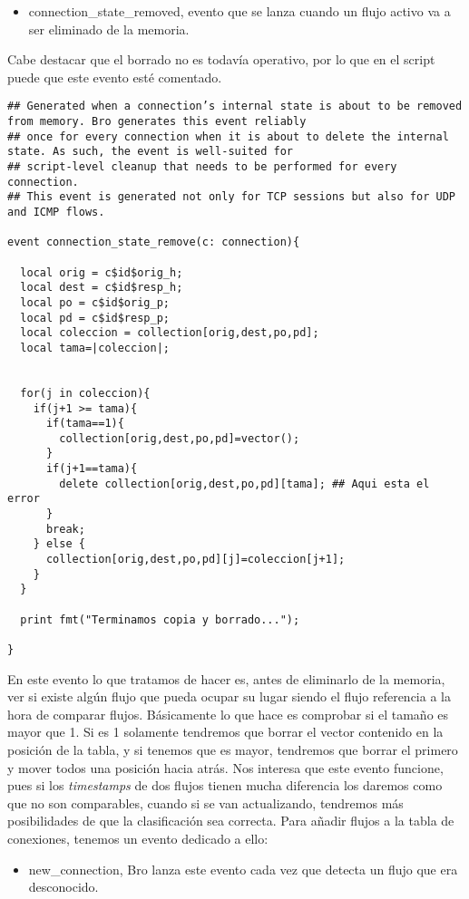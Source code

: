 \begin{itemize}
\item connection\_state\_removed, evento que se lanza cuando un flujo activo va a ser 
eliminado de la memoria.
\end{itemize}

Cabe destacar que el borrado no es todavía operativo, por lo que en el script puede 
que este evento esté comentado.
\intro
\begin{lstlisting}[style=Codigoc]
## Generated when a connection’s internal state is about to be removed from memory. Bro generates this event reliably
## once for every connection when it is about to delete the internal state. As such, the event is well-suited for
## script-level cleanup that needs to be performed for every connection.
## This event is generated not only for TCP sessions but also for UDP and ICMP flows.

event connection_state_remove(c: connection){

  local orig = c$id$orig_h;
  local dest = c$id$resp_h;
  local po = c$id$orig_p;
  local pd = c$id$resp_p;
  local coleccion = collection[orig,dest,po,pd];
  local tama=|coleccion|;


  for(j in coleccion){
    if(j+1 >= tama){
      if(tama==1){
        collection[orig,dest,po,pd]=vector();
      }
      if(j+1==tama){
        delete collection[orig,dest,po,pd][tama]; ## Aqui esta el error
      }
      break;
    } else {
      collection[orig,dest,po,pd][j]=coleccion[j+1];
    }
  }

  print fmt("Terminamos copia y borrado...");

}

\end{lstlisting}

En este evento lo que tratamos de hacer es, antes de eliminarlo de 
la memoria, ver si existe algún flujo que pueda ocupar su lugar 
siendo el flujo referencia a la hora de comparar flujos. Básicamente 
lo que hace es comprobar si el tamaño es mayor que 1. Si es 1 solamente 
tendremos que borrar el vector contenido en la posición de la tabla, 
y si tenemos que es mayor, tendremos que borrar el primero y mover todos 
una posición hacia atrás. Nos interesa que este evento funcione, pues 
si los \textit{timestamps} de dos flujos tienen mucha diferencia los daremos 
como que no son comparables, cuando si se van actualizando, tendremos más 
posibilidades de que la clasificación sea correcta.
\intro
Para añadir flujos a la tabla de conexiones, tenemos un evento 
dedicado a ello:
\intro
\begin{itemize}
\item new\_connection, Bro lanza este evento cada vez que detecta un flujo que era desconocido.
\end{itemize}

